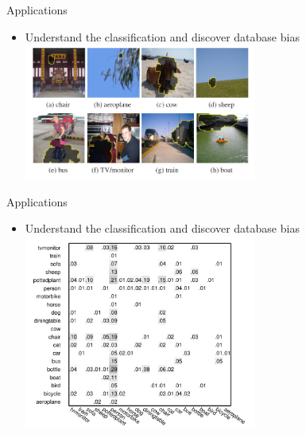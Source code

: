 \documentclass[12pt]{beamer}
\begin{document}
\begin{frame}{Applications}
    \begin{itemize}
        \item Understand the classification and discover database bias
        \medskip
        \includegraphics[width=0.6\textwidth]{fig3.png} \\
    \end{itemize}
\end{frame}

\begin{frame}{Applications}
    \begin{itemize}
        \item Understand the classification and discover database bias
        \medskip
        \includegraphics[width=0.6\textwidth]{fig5.png} \\
    \end{itemize}
\end{frame}
\end{document}
